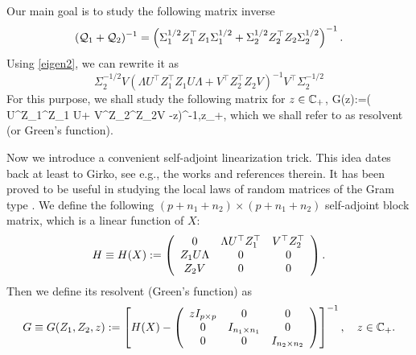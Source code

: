 \documentclass{article}
\begin{document}
Our main goal is to study the following matrix inverse
\begin{align*}
(\cal Q_1+\cal Q_2)^{-1}=\left( \Sigma_1^{1/2}Z_1^\top Z_1\Sigma_1^{1/2}+\Sigma_2^{1/2}Z_2^\top Z_2\Sigma_2^{1/2}\right)^{-1} .
\end{align*}
Using \eqref{eigen2}, we can rewrite it as
$$\Sigma_2^{-1/2}V\left(   \Lambda U^\top Z_1^\top Z_1 U\Lambda  + V^\top Z_2^\top Z_2V\right)^{-1}V^\top\Sigma_2^{-1/2}$$
For this purpose, we shall study the following matrix for $z\in \C_+$, 
\be\label{mainG}
\cal G(z):=\left(   \Lambda U^\top Z_1^\top Z_1 U\Lambda  + V^\top Z_2^\top Z_2V -z\right)^{-1},\quad z\in \C_+,
\ee
which we shall refer to as resolvent (or Green's function).

Now we introduce a convenient self-adjoint linearization trick. This idea dates back at least to Girko, see e.g., the works \cite{girko2012theory,girko1975random,girko1985spectral} and references therein. It has been proved to be useful in studying the local laws of random matrices of the Gram type \cite{Alt_Gram, AEK_Gram, Anisotropic, XYY_circular}. We define the following $(p+n_1+n_2)\times (p+n_1+n_2)$ self-adjoint block matrix, which is a linear function of $X$:
 \begin{equation}\label{linearize_block}
   H \equiv H(X): = \left( {\begin{array}{*{20}c}
   { 0 } & \Lambda U^{\top}Z_1^\top & V^\top Z_2^\top  \\
   {Z_1 U\Lambda  } & {0} & 0 \\
   {Z_2V} & 0 & 0
   \end{array}} \right).
 \end{equation}
Then we define its resolvent (Green's function) as
 \begin{equation}\label{eqn_defG}
 G \equiv G (Z_1,Z_2,z):= \left[H(X)-\left( {\begin{array}{*{20}c}
   { zI_{p\times p}} & 0 & 0 \\
   0 & { I_{n_1\times n_1}}  & 0\\
      0 & 0  & { I_{n_2\times n_2}}\\
\end{array}} \right)\right]^{-1} , \quad z\in \mathbb C_+ .
 \end{equation}
\end{document}
